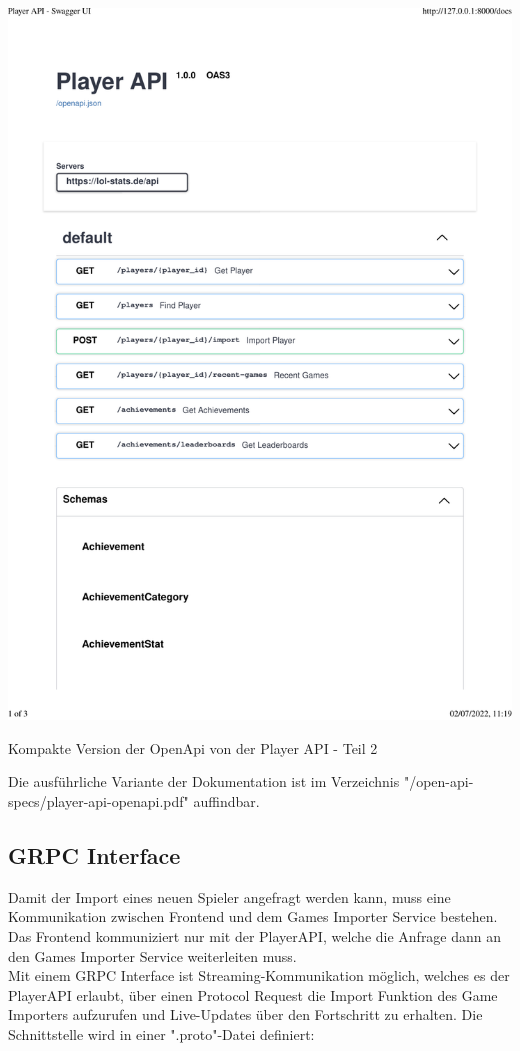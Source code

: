 \begin{center}
  \includegraphics[width=1\textwidth, page=2]{images/pdfs/player-api-openapi-short.pdf}
  \caption{Kompakte Version der OpenApi von der Player API - Teil 2}
  \label{fig:compact_player_openapi_2}
\end{center}

Die ausführliche Variante der Dokumentation ist im Verzeichnis "/open-api-specs/player-api-openapi.pdf" auffindbar.

\subsection{GRPC Interface}
Damit der Import eines neuen Spieler angefragt werden kann, muss eine Kommunikation zwischen Frontend und dem Games Importer Service bestehen. Das Frontend kommuniziert nur mit der PlayerAPI, welche die Anfrage dann an den Games Importer Service weiterleiten muss.\\
Mit einem GRPC Interface ist Streaming-Kommunikation möglich, welches es der PlayerAPI erlaubt, über einen Protocol Request die Import Funktion des Game Importers aufzurufen und Live-Updates über den Fortschritt zu erhalten.
Die Schnittstelle wird in einer ".proto"-Datei definiert:

